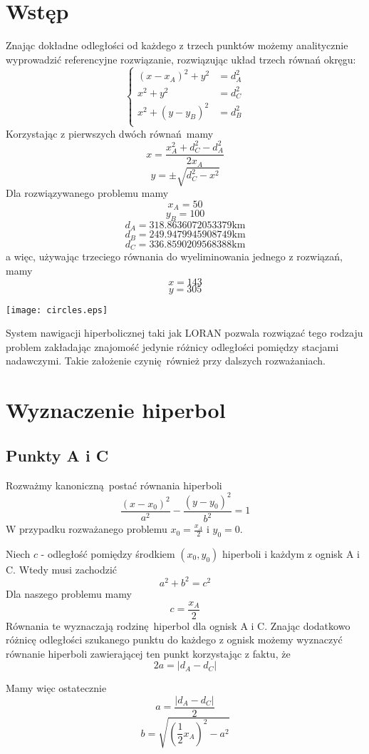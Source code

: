 \documentclass[11pt]{article}
\begin{document}
\section{Wstęp}
Znając dokładne odległości od każdego z trzech punktów możemy analitycznie
wyprowadzić referencyjne rozwiązanie, rozwiązując układ trzech równań okręgu:
\[
    \begin{cases}
        (x - x_A)^2 + y^2 &= d_A^2 \\
        x^2 + y^2 &= d_C^2 \\
        x^2 + (y-y_B)^2 &= d_B^2 \\
    \end{cases}
\]
Korzystając z pierwszych dwóch równań mamy
\[ x = \frac{x_A^2 + d_C^2 - d_A^2}{2x_A} \]
\[ y = \pm \sqrt{d_C^2 - x^2} \]
Dla rozwiązywanego problemu mamy
\[ x_A = 50 \]
\[ y_B = 100 \]
\[ d_A = 318.8636072053379\mbox{km} \]
\[ d_B = 249.9479945908749\mbox{km} \]
\[ d_C = 336.8590209568388\mbox{km} \]
a więc, używając trzeciego równania do wyeliminowania jednego z rozwiązań, mamy
\[ x = 143 \]
\[ y = 305 \]

\texttt{[image: circles.eps]}

System nawigacji hiperbolicznej taki jak LORAN pozwala rozwiązać tego rodzaju
problem zakładając znajomość jedynie różnicy odległości pomiędzy stacjami
nadawczymi.  Takie założenie czynię również przy dalszych rozważaniach.


\section{Wyznaczenie hiperbol}
\subsection{Punkty A i C}
Rozważmy kanoniczną postać równania hiperboli
\[ \frac{(x-x_0)^2}{a^2} - \frac{(y-y_0)^2}{b^2} = 1 \]
W przypadku rozważanego problemu $x_0 = \frac{x_A}{2}$ i $y_0 = 0$.

Niech $c$ - odległość pomiędzy środkiem $(x_0, y_0)$ hiperboli i każdym z ognisk
A i C.  Wtedy musi zachodzić
\[ a^2 + b^2 = c^2 \]
Dla naszego problemu mamy
\[ c = \frac{x_A}{2} \]
Równania te wyznaczają rodzinę hiperbol dla ognisk A i C.  Znając dodatkowo
różnicę odległości szukanego punktu do każdego z ognisk możemy wyznaczyć równanie
hiperboli zawierającej ten punkt korzystając z faktu, że
\[ 2a = |d_A - d_C| \]

Mamy więc ostatecznie
\[ a = \frac{|d_A - d_C|}{2} \]
\[ b = \sqrt{\left(\frac 1 2 x_A\right)^2 - a^2} \]
\end{document}
